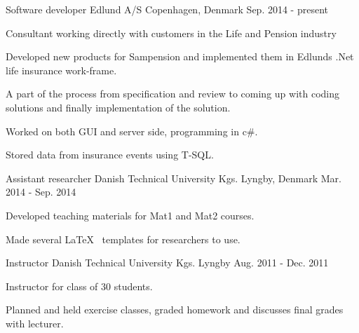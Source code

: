 


\begin{cventries}


\cventry
{Software developer} %
{Edlund A/S} %
{Copenhagen, Denmark} %
{Sep. 2014 - present } %
{ %
\begin{cvitems}
\item {Consultant working directly with customers in the Life and Pension industry}
  \item {Developed new products for Sampension and implemented them in Edlunds .Net life insurance work-frame.}
  \item {A part of the process from specification and review to coming up with coding solutions and finally implementation of the solution.}
  \item {Worked on both GUI and server side, programming in c\#.}
  \item {Stored data from insurance events using T-SQL.}
\end{cvitems}
}


\cventry
{Assistant researcher} %
{Danish Technical University} %
{Kgs. Lyngby, Denmark} %
{Mar. 2014 - Sep. 2014} %
{ %
\begin{cvitems}
  \item {Developed teaching materials for Mat1 and Mat2 courses.}
  \item {Made several \LaTeX~ templates for researchers to use.}
\end{cvitems}
}


\cventry
{Instructor}
{Danish Technical University} %
{Kgs. Lyngby} %
{Aug. 2011 - Dec. 2011} %
{ %
\begin{cvitems}
  \item {Instructor for class of 30 students.}
  \item {Planned and held exercise classes, graded homework and discusses final grades with lecturer.}
\end{cvitems}
}




\end{cventries}
